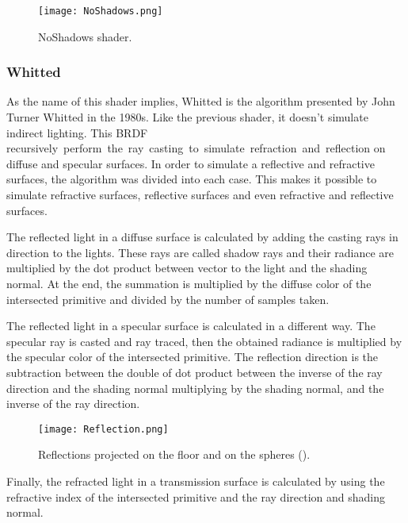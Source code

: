 \begin{figure}[H]
	\centering
	\caption{NoShadows shader.}
	\label{NoShadows shader.}
	\texttt{[image: NoShadows.png]}
\end{figure}

\subsubsection{Whitted}

\par
As the name of this shader implies, Whitted is the algorithm presented by John Turner Whitted in the 1980s.
Like the previous shader, it doesn't simulate indirect lighting.
This BRDF recursively perform the ray casting to simulate refraction and reflection on diffuse and specular surfaces.
In order to simulate a reflective and refractive surfaces, the algorithm was divided into each case.
This makes it possible to simulate refractive surfaces, reflective surfaces and even refractive and reflective surfaces.

\par
The reflected light in a diffuse surface is calculated by adding the casting rays in direction to the lights.
These rays are called shadow rays and their radiance are multiplied by the dot product between vector to the light and the shading normal.
At the end, the summation is multiplied by the diffuse color of the intersected primitive and divided by the number of samples taken.

\par
The reflected light in a specular surface is calculated in a different way.
The specular ray is casted and ray traced, then the obtained radiance is multiplied by the specular color of the intersected primitive.
The reflection direction is the subtraction between the double of dot product between the inverse of the ray direction and the shading normal multiplying by the shading normal, and the inverse of the ray direction.

\begin{figure}[H]
	\centering
	\caption{Reflections projected on the floor and on the spheres (\cite{RTReflections}).}
	\label{Reflection.}
	\texttt{[image: Reflection.png]}
\end{figure}

\par
Finally, the refracted light in a transmission surface is calculated by using the refractive index of the intersected primitive and the ray direction and shading normal.


